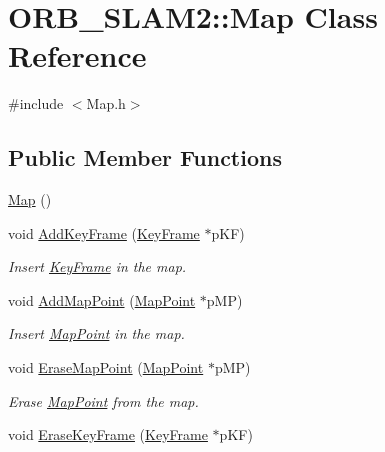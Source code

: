 \hypertarget{class_o_r_b___s_l_a_m2_1_1_map}{}\section{O\+R\+B\+\_\+\+S\+L\+A\+M2\+:\+:Map Class Reference}
\label{class_o_r_b___s_l_a_m2_1_1_map}


{\ttfamily \#include $<$Map.\+h$>$}

\subsection*{Public Member Functions}
\begin{DoxyCompactItemize}
\item 
\mbox{\hyperlink{class_o_r_b___s_l_a_m2_1_1_map_a1ab4040dee1287a387124b7d52ac8a02}{Map}} ()
\item 
void \mbox{\hyperlink{class_o_r_b___s_l_a_m2_1_1_map_a688de3b072e0176bb288bb70d36cd0e9}{Add\+Key\+Frame}} (\mbox{\hyperlink{class_o_r_b___s_l_a_m2_1_1_key_frame}{Key\+Frame}} $\ast$p\+KF)
\begin{DoxyCompactList}\small\item\em Insert \mbox{\hyperlink{class_o_r_b___s_l_a_m2_1_1_key_frame}{Key\+Frame}} in the map. \end{DoxyCompactList}\item 
void \mbox{\hyperlink{class_o_r_b___s_l_a_m2_1_1_map_a2d8e1b4376778dfe32df90ec00b599e3}{Add\+Map\+Point}} (\mbox{\hyperlink{class_o_r_b___s_l_a_m2_1_1_map_point}{Map\+Point}} $\ast$p\+MP)
\begin{DoxyCompactList}\small\item\em Insert \mbox{\hyperlink{class_o_r_b___s_l_a_m2_1_1_map_point}{Map\+Point}} in the map. \end{DoxyCompactList}\item 
void \mbox{\hyperlink{class_o_r_b___s_l_a_m2_1_1_map_af3c82d5e66815fe66cbfb736784f15b5}{Erase\+Map\+Point}} (\mbox{\hyperlink{class_o_r_b___s_l_a_m2_1_1_map_point}{Map\+Point}} $\ast$p\+MP)
\begin{DoxyCompactList}\small\item\em Erase \mbox{\hyperlink{class_o_r_b___s_l_a_m2_1_1_map_point}{Map\+Point}} from the map. \end{DoxyCompactList}\item 
void \mbox{\hyperlink{class_o_r_b___s_l_a_m2_1_1_map_a082d4a5ec57a48a7591d6769e4778a80}{Erase\+Key\+Frame}} (\mbox{\hyperlink{class_o_r_b___s_l_a_m2_1_1_key_frame}{Key\+Frame}} $\ast$p\+KF)

\end{DoxyCompactItemize}
